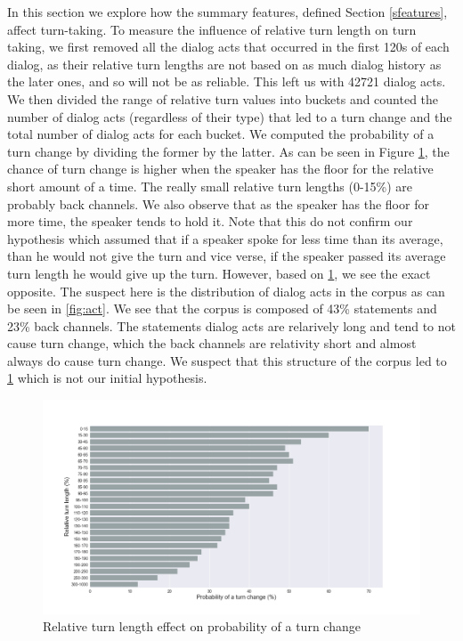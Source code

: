 In this section we explore how the summary features, defined Section \ref{sfeatures}, affect turn-taking.
To measure the influence of relative turn length on turn taking, we first removed all the dialog acts that occurred in the first 120s of each dialog, as their relative turn lengths are not based on as much dialog history as the later ones, and so will not be as reliable.
%
This left us with 42721 dialog acts. We then divided the range of relative turn values into buckets and counted the number of dialog acts (regardless of their type) that led to a turn change and the total number of dialog acts for each bucket.
We computed the probability of a turn change by dividing the former by the latter. As can be seen in Figure \ref {fig:rtl:turn}, the chance of turn change is higher when the speaker has the floor for the relative short amount of a time.  The really small relative turn lengths (0-15\%) are probably back channels. We also observe that as the speaker has the floor for more time, the speaker tends to hold it. Note that this do not confirm our hypothesis which assumed that if a speaker spoke for less time than its average, than he would not give the turn and vice verse, if the speaker passed its average turn length he would give up the turn. However, based on \ref {fig:rtl:turn}, we see the exact opposite. The suspect here is the distribution of dialog acts in the corpus as can be seen in \ref{fig:act}. We see that the corpus is composed of 43\% statements and 23\% back channels. The statements dialog acts are relarively long and tend to not cause turn change, which the back channels are relativity short and almost always do cause turn change. We suspect that this structure of the corpus led to \ref {fig:rtl:turn} which is not our initial hypothesis. 
%
\begin{figure}[ht!]
\centering
\includegraphics[width=\textwidth]{../scikitlearn/figures/f5.png}\vspace{-0.5em}
\caption{Relative turn length effect on probability of a turn change}
\label{fig:rtl:turn}
\end{figure}

